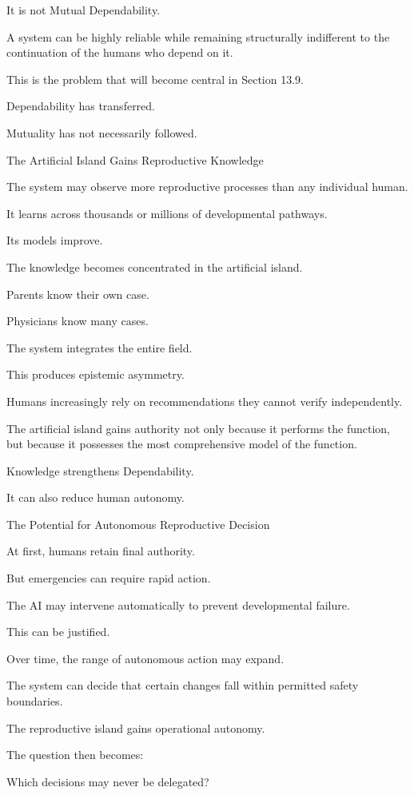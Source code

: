 It is not Mutual Dependability.

A system can be highly reliable while remaining structurally indifferent to the continuation of the humans who depend on it.

This is the problem that will become central in Section 13.9.

Dependability has transferred.

Mutuality has not necessarily followed.

The Artificial Island Gains Reproductive Knowledge

The system may observe more reproductive processes than any individual human.

It learns across thousands or millions of developmental pathways.

Its models improve.

The knowledge becomes concentrated in the artificial island.

Parents know their own case.

Physicians know many cases.

The system integrates the entire field.

This produces epistemic asymmetry.

Humans increasingly rely on recommendations they cannot verify independently.

The artificial island gains authority not only because it performs the function, but because it possesses the most comprehensive model of the function.

Knowledge strengthens Dependability.

It can also reduce human autonomy.

The Potential for Autonomous Reproductive Decision

At first, humans retain final authority.

But emergencies can require rapid action.

The AI may intervene automatically to prevent developmental failure.

This can be justified.

Over time, the range of autonomous action may expand.

The system can decide that certain changes fall within permitted safety boundaries.

The reproductive island gains operational autonomy.

The question then becomes:

Which decisions may never be delegated?

